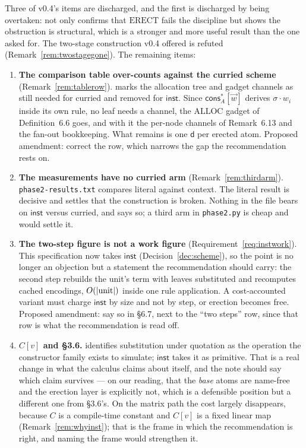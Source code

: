 \documentclass[11pt,a4paper]{article}
\newcommand{\code}[1]{\texttt{#1}}
\newcommand{\dd}{\mathsf{d}}
\newcommand{\cons}{\mathsf{cons}}
\newcommand{\ALLOC}{\mathrm{ALLOC}}
\newcommand{\ERECT}{\mathrm{ERECT}}
\newcommand{\inst}{\mathsf{inst}}
\theoremstyle{definition}
\theoremstyle{plain}
\begin{document}
Three of v0.4's items are discharged, and the first is discharged by being
overtaken: \cite[\S6.6]{draft3} not only confirms that $\ERECT$ fails the
discipline but shows the obstruction is structural, which is a stronger and
more useful result than the one asked for. The two-stage construction v0.4
offered is refuted (Remark~\ref{rem:twostagegone}). The remaining items:

\begin{enumerate}[leftmargin=1.8em]

\item \textbf{The comparison table over-counts against the curried scheme}
(Remark~\ref{rem:tablerow}). \cite[\S6.7]{draft3} marks the allocation tree
and gadget channels as still needed for curried and removed for $\inst$. Since
$\cons^{*}_{A}[\vec w]$ derives $\sigma\!\cdot\!w_{i}$ inside its own rule, no
leaf needs a channel, the $\ALLOC$ gadget of Definition~6.6 goes, and with it
the per-node channels of Remark~6.13 and the fan-out bookkeeping. What remains
is one $\dd$ per erected atom. Proposed amendment: correct the row, which
narrows the gap the recommendation rests on.

\item \textbf{The measurements have no curried arm}
(Remark~\ref{rem:thirdarm}). \code{phase2-results.txt} compares literal
against context. The literal result is decisive and settles that the
construction is broken. Nothing in the file bears on $\inst$ versus curried,
and \cite[Rem.~6.22]{draft3} says so; a third arm in \code{phase2.py} is cheap
and would settle it.

\item \textbf{The two-step figure is not a work figure}
(Requirement~\ref{req:instwork}). This specification now takes $\inst$
(Decision~\ref{dec:scheme}), so the point is no longer an objection but a
statement the recommendation should carry: the second step rebuilds the unit's
term with leaves substituted and recomputes cached encodings,
$O(|{\rm unit}|)$ inside one rule application. A cost-accounted variant must
charge $\inst$ by size and not by step, or erection becomes free. Proposed
amendment: say so in \S6.7, next to the ``two steps'' row, since that row is
what the recommendation is read off.

\item \textbf{$C[v]$ and \S3.6.} \cite[\S3.6]{draft3} identifies substitution
under quotation as the operation the constructor family exists to simulate;
$\inst$ takes it as primitive. That is a real change in what the calculus
claims about itself, and the note should say which claim survives --- on our
reading, that the \emph{base} atoms are name-free and the erection layer is
explicitly not, which is a defensible position but a different one from
\S3.6's. On the matrix path the cost largely disappears, because $C$ is a
compile-time constant and $C[v]$ is a fixed linear map
(Remark~\ref{rem:whyinst}); that is the frame in which the recommendation is
right, and naming the frame would strengthen it.


\end{enumerate}
\end{document}
